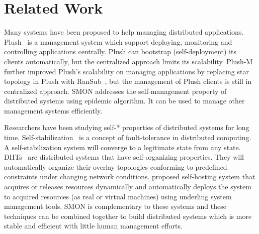 \section{Related Work}
\label{sec:related}

Many systems have been proposed to help managing distributed
applications. Plush~\cite{Albrecht2007} is a management
system which support deploying, monitoring and controlling
applications centrally. Plush can bootstrap
(self-deployment) its clients automatically, but the
centralized approach limits its scalability.
Plush-M~\cite{Topilski2008} further improved Plush's
scalability on managing applications by replacing star
topology in Plush with RanSub~\cite{Kostic2003}, but the
management of Plush clients is still in centralized
approach. SMON addresses the self-management property of
distributed systems using epidemic algorithm. It can be used
to manage other management systems efficiently.

Researchers have been studying self-* properties of
distributed systems for long time.
Self-stabilization~\cite{Dijkstra1974} is a concept of
fault-tolerance in distributed computing. A
self-stabilization system will converge to a legitimate
state from any state. DHTs~\cite{Stoica2001, Ratnasamy2001,
Rowstron2001} are distributed systems that have
self-organizing properties. They will automatically organize
their overlay topologies conforming to predefined
constraints under changing network conditions.
\cite{Yin2008} proposed self-hosting system that acquires or
releases resources dynamically and automatically deploys the
system to acquired resources (as real or virtual machines)
using underling system management tools. SMON is
complementary to these systems and these techniques can be
combined together to build distributed systems which is more
stable and efficient with little human management efforts.




